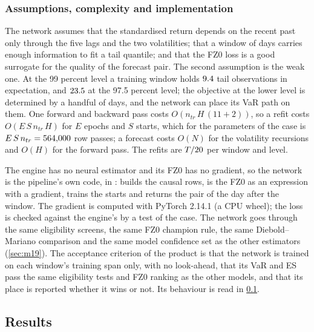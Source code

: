 \subsubsection{Assumptions, complexity and implementation}
The network assumes that the standardised return depends on the recent past only through the five lags and the two volatilities; that a window of \mkNnTrainRows{} days carries enough information to fit a
tail quantile; and that the FZ0 loss is a good surrogate for the quality of the forecast pair. The second assumption is the weak one. At the 99 percent level a training window holds $9.4{}$ tail observations
in expectation, and $23.5{}$ at the 97.5 percent level; the objective at the lower level is determined by a handful of days, and the network can place its VaR path on them. One forward and backward pass costs
$O(n_{tr}\,H\,(11+2))$, so a refit costs $O(E\,S\,n_{tr}\,H)$ for $E$ epochs and $S$ starts, which for the parameters of the case is $E\,S\,n_{tr}=564{,}000{}$ row passes; a forecast costs $O(N)$ for the volatility
recursions and $O(H)$ for the forward pass. The refits are $T/20{}$ per window and level.

The engine has no neural estimator and its FZ0 has no gradient, so the network is the pipeline's own code, in :  builds the causal rows,
 is the FZ0 as an expression with a gradient,  trains the starts and  returns the pair of the day after the window. The gradient is computed with PyTorch 2.14.1 (a CPU wheel);
the loss is checked against the engine's  by a test of the case. The network goes through the same eligibility screens, the same FZ0 champion rule, the same Diebold--Mariano comparison and the same
model confidence set as the other estimators (\cref{sec:m19}). The acceptance criterion of the product is that the network is trained on each window's training span only, with no look-ahead, that its VaR and ES
pass the same eligibility tests and FZ0 ranking as the other models, and that its place is reported whether it wins or not. Its behaviour is read in \cref{sec:results-market}.

\subsection{Results}
\label{sec:results-market}

